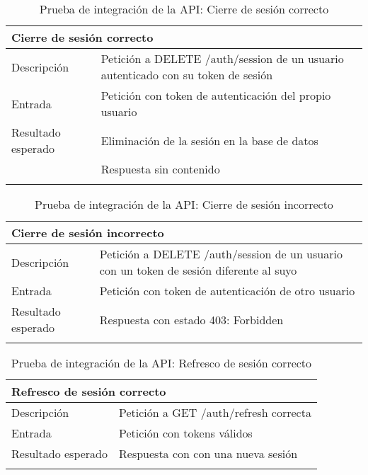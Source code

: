 \newpage
\begin{longtable}{|p{} p{}|}
    \hline
    \multicolumn{2}{|l|}{\textbf{Cierre de sesión correcto}} \\ \hline 
    Descripción                 & Petición a DELETE /auth/session de un usuario autenticado con su token de sesión \\ \hline
    Entrada                     & Petición con token de autenticación del propio usuario \\ \hline
    Resultado esperado          & Eliminación de la sesión en la base de datos \\
                                & Respuesta sin contenido \\ \hline
    \caption{Prueba de integración de la API: Cierre de sesión correcto}
    \label{cp:i:api:cierre_sesion_correcto}
\end{longtable}

\vspace{-15pt}
\begin{longtable}{|p{} p{}|}
    \hline
    \multicolumn{2}{|l|}{\textbf{Cierre de sesión incorrecto}} \\ \hline 
    Descripción                 & Petición a DELETE /auth/session de un usuario con un token de sesión diferente al suyo \\ \hline
    Entrada                     & Petición con token de autenticación de otro usuario \\ \hline
    Resultado esperado          & Respuesta con estado 403: Forbidden \\ \hline
    \caption{Prueba de integración de la API: Cierre de sesión incorrecto}
    \label{cp:i:api:cierre_sesion_incorrecto}
\end{longtable}

\vspace{-15pt}
\begin{longtable}{|p{} p{}|}
    \hline
    \multicolumn{2}{|l|}{\textbf{Refresco de sesión correcto}} \\ \hline 
    Descripción                 & Petición a GET /auth/refresh correcta \\ \hline
    Entrada                     & Petición con tokens válidos \\ \hline
    Resultado esperado          & Respuesta con con una nueva sesión \\ \hline
    \caption{Prueba de integración de la API: Refresco de sesión correcto}
    \label{cp:i:api:refresco_sesion_correcto}
\end{longtable}

